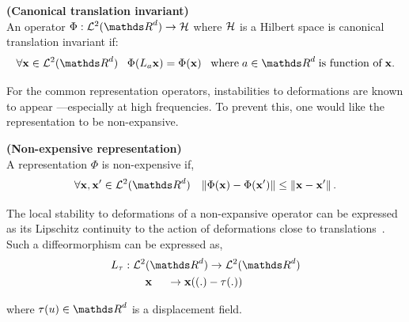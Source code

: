 \documentclass[a4paper,11pt]{report}
\begin{document}
      \begin{defn} \textbf{(Canonical translation invariant)}\\ 
				An operator $\Phi: \mcalL^{2}(\dsR^{d}) \rightarrow \mcalH$ where $\mathcal{H}$ is a Hilbert space is canonical translation invariant if:
        \begin{equation*}
			  		\forall \bfx \in \mcalL^{2}(\dsR^{d}) \;\;\;
			  		\Phi(L_{a}\bfx) = \Phi(\bfx) 
			  		\;\;\; \text{where} \; a \in \dsR^{d} \; \text{is function of} \; \bfx.
				\end{equation*}
				\label{def:Canonical translation invariance - intuition}
      \end{defn}
      
      For the common representation operators, instabilities to deformations are known to appear ---especially at high frequencies. To prevent this, one would like the representation to be non-expansive.
      
      \begin{defn} \textbf{(Non-expensive representation)}\\
				A representation $\Phi$ is non-expensive if,
				\begin{equation}
			  		\forall \bfx,\bfx' \in \mcalL^{2}(\dsR^{d}) \;\;\; 
			  		\norm{\Phi(\bfx) - \Phi(\bfx')} \leq \norm{\bfx-\bfx'}.
				\end{equation}
				\label{def:Non-expansivity - intuition}
      \end{defn}
      
      The local stability to deformations of a non-expansive operator can be expressed as its Lipschitz continuity to the action of deformations close to translations~\citep{mallat2012gis}. Such a diffeormorphism can be expressed as,
      \begin{equation*}
      		\begin{split}
      			L_{\tau}	: \; & \mcalL^{2}(\dsR^{d}) \rightarrow \mcalL^{2}(\dsR^{d})\\
      							  & \;\;\;\; \bfx \;\;\;\;\; \rightarrow  \bfx((.) - \tau(.))
				\end{split}
      \end{equation*}

			where $\tau(u) \in \dsR^{d}$ is a displacement field.
			
\end{document}
